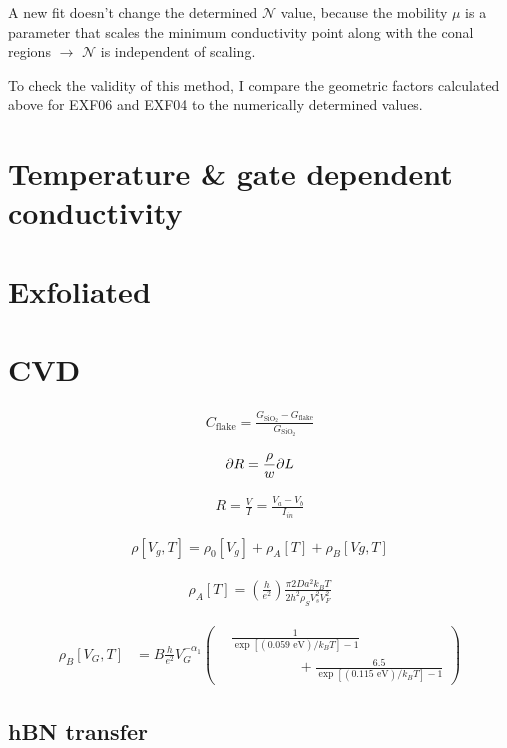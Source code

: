 \documentclass[../Matt_Gebert_Honours_Thesis.tex]{subfiles}
\begin{document}
A new fit doesn't change the determined $\mathcal{N}$ value, because the mobility $\mu$ is a parameter that scales the minimum conductivity point along with the conal regions $\to$ $\mathcal{N}$ is independent of scaling. 

To check the validity of this method, I compare the geometric factors calculated above for EXF06 and EXF04 to the numerically determined values.



\section{Temperature \& gate dependent conductivity}




\section{Exfoliated}\label{sec:pristine_exfoliated}



\section{CVD}\label{sec:pristine_cvd}

\begin{align}
	C_{\text{flake}} = \frac{G_{\text{SiO}_2}-G_{\text{flake}}}{G_{\text{SiO}_2}}
\end{align}

\begin{align}
	\partial R = \frac{\rho}{w} \partial L
\end{align}

\begin{align}
	R = \frac{V}{I} = \frac{V_a-V_b}{I_{in}}
\end{align}


\begin{align}
	\rho[V_g,T] = \rho_0[V_g] + \rho_A[T] + \rho_B[Vg,T]
\end{align}

\begin{align}
	\rho_A[T] = \left(\frac{h}{e^2}\right) \frac{\pi2 Da^2 k_B T}{2 h^2 \rho_S V_s^2 V_F^2}
\end{align}

\begin{align}
\rho_B[V_G,T]&= B \frac{h}{e^2} V_G^{-\alpha_1} \left(\begin{aligned}
&\frac{1}{\exp\left[(0.059\text{ eV})/k_B T\right]-1}\\ &\hspace{2cm}+\frac{6.5}{\exp\left[(0.115\text{ eV})/k_B T\right]-1}
\end{aligned}\right)
\end{align}

\subsection{hBN transfer}
\end{document}
